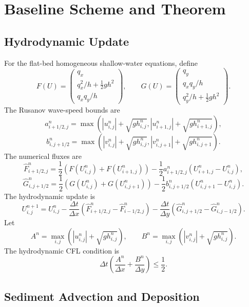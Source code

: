 \section{Baseline Scheme and Theorem}

\subsection{Hydrodynamic Update}

For the flat-bed homogeneous shallow-water equations, define
\[
F(U)=
\begin{pmatrix}
q_x\\ q_x^2/h+\frac12gh^2\\ q_xq_y/h
\end{pmatrix},
\qquad
G(U)=
\begin{pmatrix}
q_y\\ q_xq_y/h\\ q_y^2/h+\frac12gh^2
\end{pmatrix}.
\]
The Rusanov wave-speed bounds are
\[
a_{i+1/2,j}^n=
\max\left(|u_{i,j}^n|+\sqrt{g h_{i,j}^n},
|u_{i+1,j}^n|+\sqrt{g h_{i+1,j}^n}\right),
\]
\[
b_{i,j+1/2}^n=
\max\left(|v_{i,j}^n|+\sqrt{g h_{i,j}^n},
|v_{i,j+1}^n|+\sqrt{g h_{i,j+1}^n}\right).
\]
The numerical fluxes are
\[
\widehat F_{i+1/2,j}^n =
\frac12\left(F(U_{i,j}^n)+F(U_{i+1,j}^n)\right)
-\frac12 a_{i+1/2,j}^n\left(U_{i+1,j}^n-U_{i,j}^n\right),
\]
\[
\widehat G_{i,j+1/2}^n =
\frac12\left(G(U_{i,j}^n)+G(U_{i,j+1}^n)\right)
-\frac12 b_{i,j+1/2}^n\left(U_{i,j+1}^n-U_{i,j}^n\right).
\]
The hydrodynamic update is
\[
U_{i,j}^{n+1}
=U_{i,j}^{n}
-\frac{\Delta t}{\Delta x}
\left(\widehat F_{i+1/2,j}^n-\widehat F_{i-1/2,j}^n\right)
-\frac{\Delta t}{\Delta y}
\left(\widehat G_{i,j+1/2}^n-\widehat G_{i,j-1/2}^n\right).
\]
Let
\[
A^n=\max_{i,j}\left(|u_{i,j}^n|+\sqrt{g h_{i,j}^n}\right),
\qquad
B^n=\max_{i,j}\left(|v_{i,j}^n|+\sqrt{g h_{i,j}^n}\right).
\]
The hydrodynamic CFL condition is
\[
\Delta t\left(\frac{A^n}{\Delta x}+\frac{B^n}{\Delta y}\right)\le \frac12 .
\]

\subsection{Sediment Advection and Deposition}

